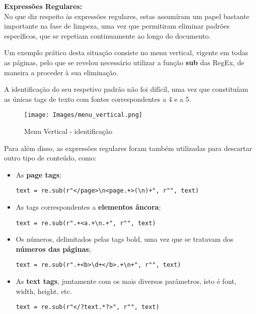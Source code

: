 \textbf{Expressões Regulares:}\\
No que diz respeito às expressões regulares, estas assumíram um papel bastante importante na fase de limpeza, uma vez que permitiram eliminar padrões específicos, que se repetiam continuamente ao longo do documento.

Um exemplo prático desta situação consiste no menu vertical, vigente em todas as páginas, pelo que se revelou necessário utilizar a função \textbf{sub} das RegEx, de maneira a proceder à sua eliminação.

A identificação do seu respetivo padrão não foi difícil, uma vez que constituíam as únicas tags de texto com fontes correspondentes a 4 e a 5. 

\begin{figure}[H]
    \centering
    \centering
    \texttt{[image: Images/menu\_vertical.png]}
    \caption{Menu Vertical - identificação}
    \label{fig:desccortada}
\end{figure}

Para além disso, as expressões regulares foram também utilizadas para descartar outro tipo de conteúdo, como:
\begin{itemize}
    \item As \textbf{page tags};
    \begin{lstlisting}[style=pythonstyle]
text = re.sub(r"</page>\n<page.+>(\n)+", r"", text) 
\end{lstlisting}
    
    \item As tags correspondentes a \textbf{elementos âncora};
    \begin{lstlisting}[style=pythonstyle]
text = re.sub(r".+<a.+\n.+", r"", text) 
\end{lstlisting}
    
    \item Os números, delimitados pelas tags bold, uma vez que se tratavam dos \textbf{números das páginas};
    \begin{lstlisting}[style=pythonstyle]
text = re.sub(r".+<b>\d+</b>.+\n+", r"", text)
\end{lstlisting}

    \item As \textbf{text tags}, juntamente com os mais diversos parâmetros, isto é font, width, height, etc.
    \begin{lstlisting}[style=pythonstyle]
text = re.sub(r"</?text.*?>", r"", text) 
\end{lstlisting}
\end{itemize}

